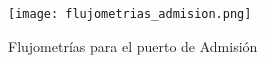 %
%

\begin{figure}
    \centering
    \texttt{[image: flujometrias\_admision.png]}
    \caption{Flujometrías para el puerto de Admisión}\label{fig:flujometrias}
\end{figure}
